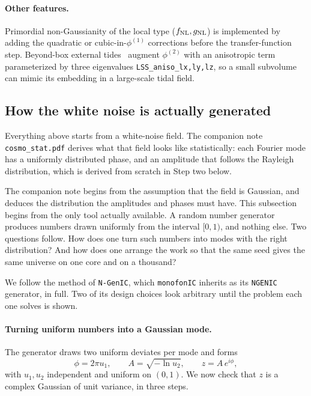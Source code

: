 \documentclass[12pt]{article}
\begin{document}
\paragraph{Other features.}  Primordial non-Gaussianity of the local
type ($f_{\rm NL}, g_{\rm NL}$) is implemented by adding the quadratic
or cubic-in-$\phi^{(1)}$ corrections before the transfer-function step.
Beyond-box external tides~\citep{Stuecker2021} augment $\phi^{(2)}$
with an anisotropic term parameterized by three eigenvalues
\texttt{LSS\_aniso\_lx,ly,lz}, so a small subvolume can mimic its
embedding in a large-scale tidal field.

\subsection{How the white noise is actually generated}
\label{sec:ngenic}

Everything above starts from a white-noise field.  The companion note
\texttt{cosmo\_stat.pdf} derives what that field looks like
statistically: each Fourier mode has a uniformly distributed phase, and
an amplitude that follows the Rayleigh distribution, which is derived
from scratch in Step two below.

The companion note begins from the assumption that the field is
Gaussian, and deduces the distribution the amplitudes and phases must
have.  This subsection begins from the only tool actually available.  A
random number generator produces numbers drawn uniformly from the
interval $[0,1)$, and nothing else.  Two questions follow.  How does one
turn such numbers into modes with the right distribution?  And how does
one arrange the work so that the same seed gives the same universe on
one core and on a thousand?

We follow the method of \texttt{N-GenIC}, which \texttt{monofonIC}
inherits as its \texttt{NGENIC} generator, in full.  Two of its design
choices look arbitrary until the problem each one solves is shown.

\paragraph{Turning uniform numbers into a Gaussian mode.}
The generator draws two uniform deviates per mode and forms
\begin{equation}
  \phi = 2\pi u_1, \qquad
  A = \sqrt{-\ln u_2}, \qquad
  z = A\,e^{i\phi},
  \label{eq:ngenic-draw}
\end{equation}
with $u_1, u_2$ independent and uniform on $(0,1)$.  We now check that
$z$ is a complex Gaussian of unit variance, in three steps.
\end{document}

